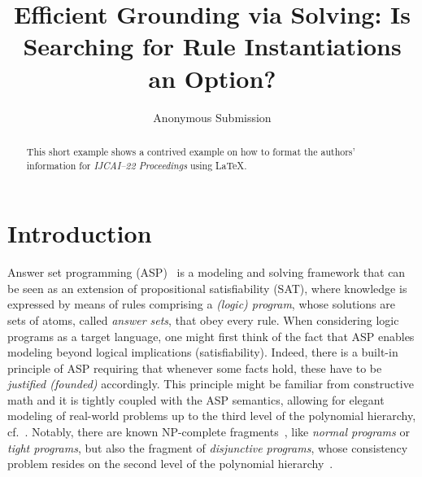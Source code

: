 \documentclass{article}
\title{Efficient Grounding via Solving: Is Searching for Rule Instantiations an Option?} %
\author{
Anonymous Submission
}
\begin{document}
\maketitle

\begin{abstract}
This short example shows a contrived example on how to format the authors' information for {\it IJCAI--22 Proceedings} using \LaTeX{}.
\end{abstract}

\section{Introduction}

Answer set programming (ASP)~\cite{BrewkaEiterTruszczynski11,GebserEtAl19,%
JanhunenNiemela16a} is a modeling and solving framework
that can be seen as an extension of propositional satisfiability (SAT),
where knowledge is expressed by means of rules comprising a \emph{(logic) program}, whose solutions are sets of atoms, called \emph{answer sets}, that obey every rule.
%
%
%
%
When considering logic programs as a target language, one might first
think of the fact that ASP enables modeling beyond logical implications (satisfiability).
%
Indeed, there is a built-in principle of ASP requiring that whenever some facts
hold, these have to be \emph{justified (founded)} accordingly. %
%
This principle might be familiar from constructive math
and it is 
tightly coupled with the ASP semantics,
allowing for 
elegant modeling of real-world problems up to the third level
of the polynomial hierarchy, cf.~\cite{}. %
%
Notably, there are known NP-complete fragments~\cite{}, like %
\emph{normal programs} or \emph{tight programs}, but also the fragment of \emph{disjunctive programs}, whose consistency problem resides on the second level of the polynomial hierarchy~\cite{}.
\end{document}

